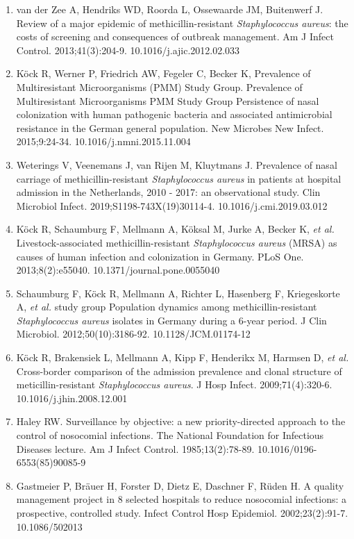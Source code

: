 \documentclass[
]{book}
\begin{document}
\begin{enumerate}
\item
  van der Zee A, Hendriks WD, Roorda L, Ossewaarde JM, Buitenwerf J. Review of a major epidemic of methicillin-resistant \emph{Staphylococcus aureus}: the costs of screening and consequences of outbreak management. Am J Infect Control. 2013;41(3):204-9. 10.1016/j.ajic.2012.02.033
\item
  Köck R, Werner P, Friedrich AW, Fegeler C, Becker K, Prevalence of Multiresistant Microorganisms (PMM) Study Group. Prevalence of Multiresistant Microorganisms PMM Study Group Persistence of nasal colonization with human pathogenic bacteria and associated antimicrobial resistance in the German general population. New Microbes New Infect. 2015;9:24-34. 10.1016/j.nmni.2015.11.004
\item
  Weterings V, Veenemans J, van Rijen M, Kluytmans J. Prevalence of nasal carriage of methicillin-resistant \emph{Staphylococcus aureus} in patients at hospital admission in the Netherlands, 2010 - 2017: an observational study. Clin Microbiol Infect. 2019;S1198-743X(19)30114-4. 10.1016/j.cmi.2019.03.012
\item
  Köck R, Schaumburg F, Mellmann A, Köksal M, Jurke A, Becker K, \emph{et al.} Livestock-associated methicillin-resistant \emph{Staphylococcus aureus} (MRSA) as causes of human infection and colonization in Germany. PLoS One. 2013;8(2):e55040. 10.1371/journal.pone.0055040
\item
  Schaumburg F, Köck R, Mellmann A, Richter L, Hasenberg F, Kriegeskorte A, \emph{et al.} study group Population dynamics among methicillin-resistant \emph{Staphylococcus aureus} isolates in Germany during a 6-year period. J Clin Microbiol. 2012;50(10):3186-92. 10.1128/JCM.01174-12
\item
  Köck R, Brakensiek L, Mellmann A, Kipp F, Henderikx M, Harmsen D, \emph{et al.} Cross-border comparison of the admission prevalence and clonal structure of meticillin-resistant \emph{Staphylococcus aureus}. J Hosp Infect. 2009;71(4):320-6. 10.1016/j.jhin.2008.12.001
\item
  Haley RW. Surveillance by objective: a new priority-directed approach to the control of nosocomial infections. The National Foundation for Infectious Diseases lecture. Am J Infect Control. 1985;13(2):78-89. 10.1016/0196-6553(85)90085-9
\item
  Gastmeier P, Bräuer H, Forster D, Dietz E, Daschner F, Rüden H. A quality management project in 8 selected hospitals to reduce nosocomial infections: a prospective, controlled study. Infect Control Hosp Epidemiol. 2002;23(2):91-7. 10.1086/502013

\end{enumerate}
\end{document}
